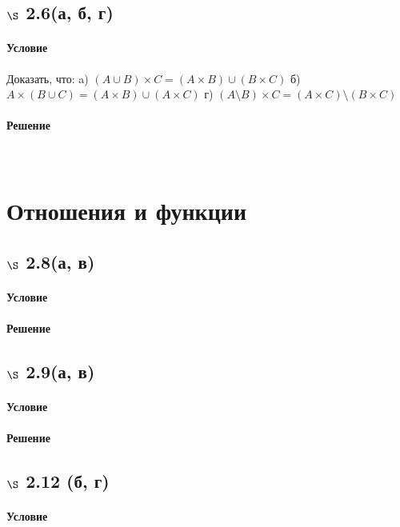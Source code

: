 \documentclass[a4paper,12pt]{article}
\begin{document}
\subsection*{$\S$ 2.6(а, б, г)}
\paragraph*{Условие}
Доказать, что:
a) $ ( A \cup B ) \times C = ( A \times B ) \cup ( B \times C ) $
б) $ A \times ( B \cup C ) = ( A \times B ) \cup ( A \times C ) $
г) $ ( A \setminus B ) \times C = ( A \times C ) \setminus ( B \times C ) $
\paragraph*{Решение} \mbox{}\\

\section{Отношения и функции}
\subsection*{$\S$ 2.8(а, в)}
\paragraph*{Условие}
\paragraph*{Решение}

\subsection*{$\S$ 2.9(а, в)}
\paragraph*{Условие}
\paragraph*{Решение}

\subsection*{$\S$ 2.12 (б, г)}
\paragraph*{Условие}
\end{document}
